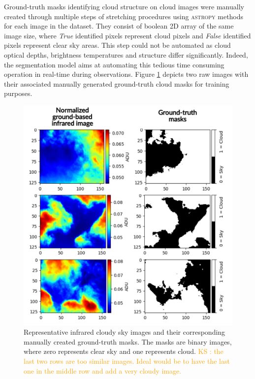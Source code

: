 \documentclass[amt, article]{copernicus}
\begin{document}
Ground-truth masks identifying cloud structure on cloud images were manually created through multiple steps of stretching procedures using \textsc{astropy} \citep{Astropy2013,Astropy2018} methods for each image in the dataset. They consist of boolean 2D array of the same image size, where \textit{True} identified pixels represent cloud pixels and \textit{False} identified pixels represent clear sky areas. This step could not be automated as cloud optical depths, brightness temperatures and structure differ significantly. Indeed, the segmentation model aims at automating this tedious time consuming operation in real-time during observations. Figure \ref{fig:cloud_images_ground_truth} depicts two raw images with their associated manually generated ground-truth cloud masks for training purposes.

\begin{figure}[t]
	\includegraphics[width=\hsize]{figures/cloud_images_ground_truth.pdf}
	\caption{Representative infrared cloudy sky images and their corresponding manually created ground-truth masks. The masks are binary images, where zero represents clear sky and one represents cloud. \textcolor{orange}{KS : the last two rows are too similar images. Ideal would be to have the last one in the middle row and add a very cloudy image.}}
    \label{fig:cloud_images_ground_truth}
\end{figure}
\end{document}
